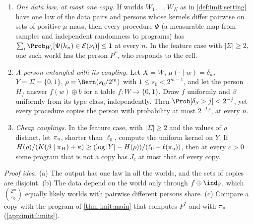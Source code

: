 \begin{proposition}\label{prop:imit:limits}
\begin{enumerate}[label=(\alph*),itemsep=1pt,topsep=2pt]
\item \emph{One data law, at most one copy.} If worlds $W_1,\dots,W_N$ as in \cref{def:imit:setting} have one law of the data pairs and persons whose kernels differ pairwise on sets of positive $\bar\mu$-mass, then every procedure $\Psi$ (a measurable map from samples and independent randomness to programs) has $\sum_i\Prob_{W_i}[\Psi(h_n)\in\mathcal E(\nu_i)]\le1$ at every $n$. In the feature case with $|\Sigma|\ge2$, one such world has the person $P^*$, who responds to the cell.
\item \emph{A person entangled with its coupling.} Let $X=W$, $\mu(\cdot\mid w)=\delta_w$, $Y=\Sigma=\{0,1\}$, $\rho=\Bern(s_0/2^m)$ with $1\le s_0<2^{m-1}$, and let the person $H_f$ answer $f(w)\oplus b$ for a table $f:W\to\{0,1\}$. Draw $f$ uniformly and $\beta$ uniformly from its type class, independently. Then $\Prob[\delta_\beta>j]<2^{-j}$, yet every procedure copies the person with probability at most $2^{-L_\beta}$, at every $n$.
\item \emph{Cheap couplings.} In the feature case, with $|\Sigma|\ge2$ and the values of $\rho$ distinct, let $\pi_{\rm u}$, shorter than $\ell_0$, compute the uniform kernel on $Y$. If $H(\rho)/(K(\beta\mid\pi_H)+\kappa)\ge(\log|Y|-H(\rho))/(\ell_0-\ell(\pi_{\rm u}))$, then at every $c>0$ some program that is not a copy has $J_c$ at most that of every copy.
\end{enumerate}
\end{proposition}

\emph{Proof idea.} (a) The output has one law in all the worlds, and the sets of copies are disjoint. (b) The data depend on the world only through $f\oplus\ind_\beta$, which $\binom{2^m}{s_0}$ equally likely worlds with pairwise different persons share. (c) Compare a copy with the program of \cref{thm:imit:main} that computes $P^*$ and with $\pi_{\rm u}$ (\cref{app:imit:limits}).


